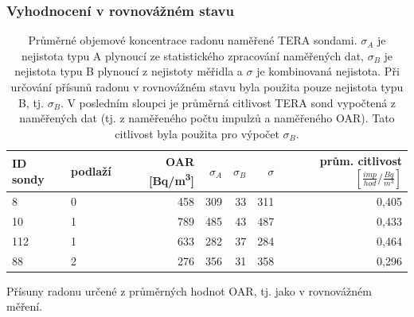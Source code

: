 \subsubsection{Vyhodnocení v rovnovážném stavu}
\begin{table}[H]
    \centering
    \caption{Průměrné objemové koncentrace radonu naměřené TERA sondami. $\sigma_A$ je nejistota typu A plynoucí ze statistického zpracování naměřených dat, $\sigma_B$ je nejistota typu B plynoucí z nejistoty měřidla a $\sigma$ je kombinovaná nejistota. Při určování přísunů radonu v rovnovážném stavu byla použita pouze nejistota typu B, tj. $\sigma_B$. V posledním sloupci je průměrná citlivost TERA sond vypočtená z naměřených dat (tj. z naměřeného počtu impulzů a naměřeného OAR). Tato citlivost byla použita pro výpočet $\sigma_B$.}
    \label{tab:skala75_OARprumerne}
    \begin{tabular}{llrrrrr}
\toprule
ID sondy&podlaží& OAR [\si{Bq/m^3}]& $\sigma_A$ & $\sigma_B$ &$\sigma$& prům. citlivost $\left[\si{\frac{imp}{hod}/\frac{Bq}{m^3}}\right]$\\ 
\midrule
8  &0 & 458 & 309 & 33 & 311&0,405\\
10 &1 & 789 & 485 & 43 & 487&0,433\\
112&1 & 633 & 282 & 37 & 284&0,464\\
88 &2 & 276 & 356 & 31 & 358&0,296\\
\bottomrule
    \end{tabular}
\end{table}

\begin{table}[H]
    \centering
    \caption{Přísuny radonu určené z průměrných hodnot OAR, tj. jako v rovnovážném měření.}
    \label{tab:skala75_prisunyRovnovazne}
   
\end{table}


